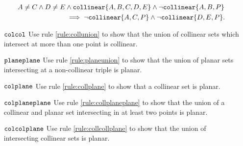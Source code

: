 \begin{itemize}
\begin{align*}
A \neq C \wedge D \neq E &\wedge \texttt{collinear} \{A, B, C, D, E\} \wedge \neg\texttt{collinear} \{A, B, P\}\\
&\implies \neg\texttt{collinear} \{A, C, P\} \wedge \neg\texttt{collinear} \{D, E, P\}.
\end{align*}
\item[$\texttt{colcol}$] Use rule \ref{rule:collunion} to show that the union of collinear sets which intersect at more than one point is collinear.
\item[$\texttt{planeplane}$] Use rule \ref{rule:planeunion} to show that the union of planar sets intersecting at a non-collinear triple is planar.
\item[$\texttt{colplane}$] Use rule \ref{rule:collplane} to show that a collinear set is planar.
\item[$\texttt{colplaneplane}$] Use rule \ref{rule:collplaneplane} to show that the union of a collinear and planar set intersecting in at least two points is planar.
\item[$\texttt{colcolplane}$] Use rule \ref{rule:collcollplane} to show that the union of intersecting collinear sets is planar.
\end{itemize}



